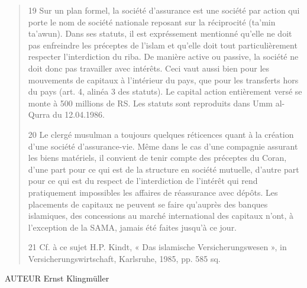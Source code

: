 \begin{quote}
19 Sur un plan formel, la société d’assurance est une société par action qui porte le nom de société nationale reposant sur la réciprocité (ta’min ta’awun). Dans ses statuts, il est expréssement mentionné qu’elle ne doit pas enfreindre les préceptes de l’islam et qu’elle doit tout particulièrement respecter l’interdiction du riba. De manière active ou passive, la société ne doit donc pas travailler avec intérêts. Ceci vaut aussi bien pour les mouvements de capitaux à l’intérieur du pays, que pour les transferts hors du pays (art. 4, alinéa 3 des statuts). Le capital action entièrement versé se monte à 500 millions de RS. Les statuts sont reproduits dans Umm al-Qurra du 12.04.1986.

20 Le clergé musulman a toujours quelques réticences quant à la création d’une société d’assurance-vie. Même dans le cas d’une compagnie assurant les biens matériels, il convient de tenir compte des préceptes du Coran, d’une part pour ce qui est de la structure en société mutuelle, d’autre part pour ce qui est du respect de l’interdiction de l’intérêt qui rend pratiquement impossibles les affaires de réassurance avec dépôts. Les placements de capitaux ne peuvent se faire qu’auprès des banques islamiques, des concessions au marché international des capitaux n’ont, à l’exception de la SAMA, jamais été faites jusqu’à ce jour.

21 Cf. à ce sujet H.P. Kindt, « Das islamische Versicherungswesen », in Versicherungswirtschaft, Karlsruhe, 1985, pp. 585 sq.
\end{quote}

AUTEUR
Ernst Klingmüller



